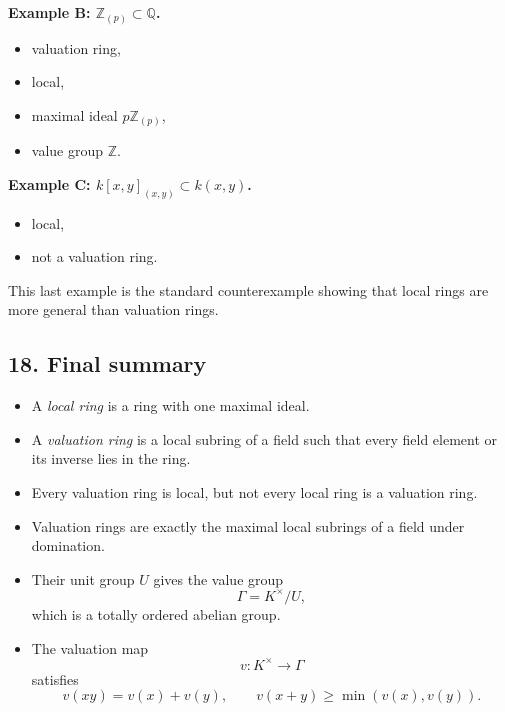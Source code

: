 \documentclass[12pt,a4paper]{article}
\theoremstyle{notespace}
\begin{document}
\textbf{Example B: \(\mathbb Z_{(p)}\subset \mathbb Q\).}
\begin{itemize}
	\item valuation ring,
	\item local,
	\item maximal ideal \(p\mathbb Z_{(p)}\),
	\item value group \(\mathbb Z\).
\end{itemize}

\textbf{Example C: \(k[x,y]_{(x,y)}\subset k(x,y)\).}
\begin{itemize}
	\item local,
	\item not a valuation ring.
\end{itemize}

This last example is the standard counterexample showing that local rings are more general than valuation rings.

\subsection*{18. Final summary}

\begin{itemize}
	\item A \emph{local ring} is a ring with one maximal ideal.
	\item A \emph{valuation ring} is a local subring of a field such that every field element or its inverse lies in the ring.
	\item Every valuation ring is local, but not every local ring is a valuation ring.
	\item Valuation rings are exactly the maximal local subrings of a field under domination.
	\item Their unit group \(U\) gives the value group
	\[
	\Gamma = K^\times/U,
	\]
	which is a totally ordered abelian group.
	\item The valuation map
	\[
	v:K^\times\to \Gamma
	\]
	satisfies
	\[
	v(xy)=v(x)+v(y),
	\qquad
	v(x+y)\ge \min(v(x),v(y)).
	\]
\end{itemize}
	
\end{document}
